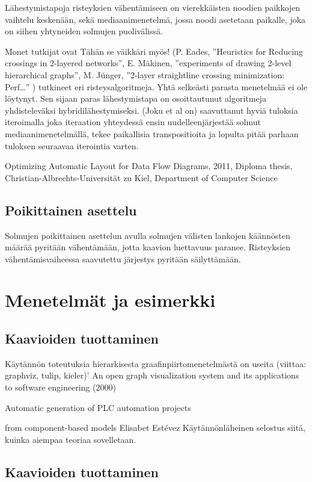 \documentclass[finnish,12pt]{article}
\begin{document}
Lähestymistapoja risteyksien vähentämiseen on vierekkäisten noodien paikkojen vaihtelu keskenään, sekä mediaanimenetelmä, jossa noodi asetetaan paikalle, joka on siihen yhtyneiden solmujen puolivälissä.

Monet tutkijat ovat Tähän se väikkäri myös! (P. Eades, ”Heuristics for Reducing crossings in 2-layered networks”, E. Mäkinen, ”experiments of drawing 2-level hierarchical graphs”, M. Jünger, ”2-layer straightline crossing minimization: Perf…” ) tutkineet eri risteysalgoritmeja. Yhtä selkeästi parasta menetelmää ei ole löytynyt. Sen sijaan paras lähestymistapa on osoittautunut algoritmeja yhdisteleväksi hybridilähestymiseksi.
(Joku et al on) saavuttanut hyviä tuloksia iteroimalla joka iteraation yhteydessä ensin uudelleenjärjestää solmut mediaanimenetelmällä, tekee paikallisia transpositioita ja lopulta pitää parhaan tuloksen seuraavaa iterointia varten.


Optimizing Automatic Layout for Data Flow Diagrams, 2011, Diploma thesis, Christian-Albrechts-Universität zu Kiel, Department of Computer Science

		\subsection{Poikittainen asettelu}

Solmujen poikittainen asettelun avulla solmujen välisten lankojen käännösten määrää pyritään vähentämään, jotta kaavion luettavuus paranee. Risteyksien vähentämisvaiheessa saavutettu järjestys pyritään säilyttämään.

	\clearpage
	\section{Menetelmät ja esimerkki}
		\subsection{Kaavioiden tuottaminen}

Käytännön toteutuksia hierarkisesta graafinpiirtomenetelmästä on useita (viittaa: graphviz, tulip, kieler)’
An open graph visualization system and its applications to software engineering (2000) 

Automatic generation of PLC automation projects

from component-based models
Elisabet Estévez
Käytännönläheinen selostus siitä, kuinka aiempaa teoriaa sovelletaan.

		\subsection{Kaavioiden tuottaminen}
\end{document}

